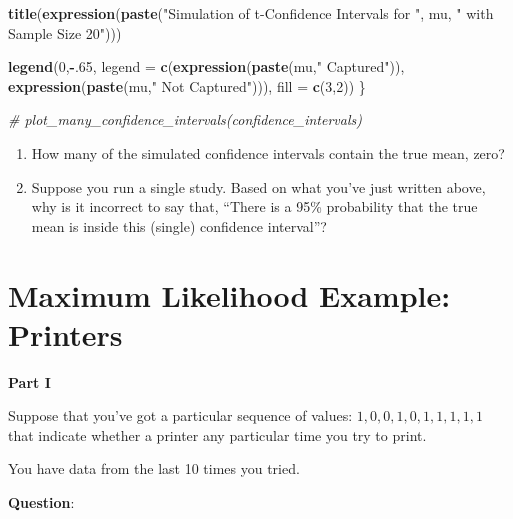 \documentclass[
]{book}
\newenvironment{Shaded}{\begin{snugshade}}{\end{snugshade}}
\newcommand{\AttributeTok}[1]{\textcolor[rgb]{0.13,0.29,0.53}{#1}}
\newcommand{\CommentTok}[1]{\textcolor[rgb]{0.56,0.35,0.01}{\textit{#1}}}
\newcommand{\DecValTok}[1]{\textcolor[rgb]{0.00,0.00,0.81}{#1}}
\newcommand{\FunctionTok}[1]{\textcolor[rgb]{0.13,0.29,0.53}{\textbf{#1}}}
\newcommand{\NormalTok}[1]{#1}
\newcommand{\SpecialCharTok}[1]{\textcolor[rgb]{0.81,0.36,0.00}{\textbf{#1}}}
\newcommand{\StringTok}[1]{\textcolor[rgb]{0.31,0.60,0.02}{#1}}
\providecommand{\tightlist}{%
  \setlength{\itemsep}{0pt}\setlength{\parskip}{0pt}}
\theoremstyle{definition}
\theoremstyle{definition}
\theoremstyle{definition}
\theoremstyle{definition}
\theoremstyle{remark}
\begin{document}
\begin{Shaded}
\begin{Highlighting}[]
  \FunctionTok{title}\NormalTok{(}\FunctionTok{expression}\NormalTok{(}\FunctionTok{paste}\NormalTok{(}\StringTok{"Simulation of t{-}Confidence Intervals for "}\NormalTok{, mu,}
                          \StringTok{" with Sample Size 20"}\NormalTok{)))}

  \FunctionTok{legend}\NormalTok{(}\DecValTok{0}\NormalTok{,}\SpecialCharTok{{-}}\NormalTok{.}\DecValTok{65}\NormalTok{, }\AttributeTok{legend =} \FunctionTok{c}\NormalTok{(}\FunctionTok{expression}\NormalTok{(}\FunctionTok{paste}\NormalTok{(mu,}\StringTok{" Captured"}\NormalTok{)),}
                             \FunctionTok{expression}\NormalTok{(}\FunctionTok{paste}\NormalTok{(mu,}\StringTok{" Not Captured"}\NormalTok{))), }\AttributeTok{fill =} \FunctionTok{c}\NormalTok{(}\DecValTok{3}\NormalTok{,}\DecValTok{2}\NormalTok{))}
\NormalTok{  \}}
\end{Highlighting}
\end{Shaded}

\begin{Shaded}
\begin{Highlighting}[]
\CommentTok{\# plot\_many\_confidence\_intervals(confidence\_intervals)}
\end{Highlighting}
\end{Shaded}

\begin{enumerate}
\def\labelenumi{\arabic{enumi}.}
\tightlist
\item
  How many of the simulated confidence intervals contain the true mean, zero?\\
\item
  Suppose you run a single study. Based on what you've just written above, why is it incorrect to say that, ``There is a 95\% probability that the true mean is inside this (single) confidence interval''?
\end{enumerate}

\section{Maximum Likelihood Example: Printers}\label{maximum-likelihood-example-printers}

\textbf{Part I}

Suppose that you've got a particular sequence of values: \({1, 0, 0, 1, 0, 1, 1, 1, 1, 1}\) that indicate whether a printer any particular time you try to print.

You have data from the last 10 times you tried.

\textbf{Question}:
\end{document}
